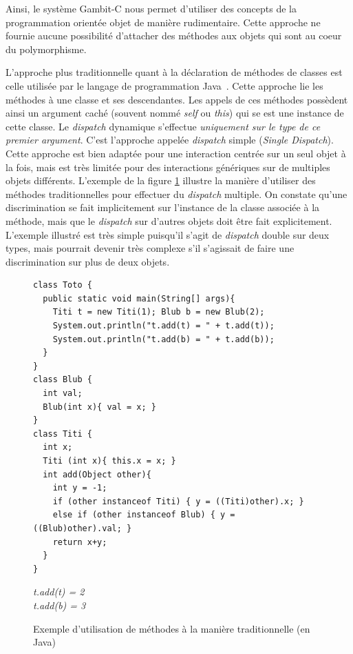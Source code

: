 \documentclass[12pt,twoside,letterpaper,francais]{book}
\begin{document}
Ainsi, le système Gambit-C nous permet d'utiliser des concepts de la
programmation orientée objet de manière rudimentaire. Cette approche
ne fournie aucune possibilité d'attacher des méthodes aux objets qui
sont au coeur du polymorphisme.

L'approche plus traditionnelle quant à la déclaration de méthodes de
classes est celle utilisée par le langage de programmation
Java~\cite{JavaSpec}. Cette approche lie les méthodes à une classe et
ses descendantes. Les appels de ces méthodes possèdent ainsi un
argument caché (souvent nommé \textit{self} ou \textit{this}) qui se
est une instance de cette classe. Le \textit{dispatch} dynamique
s'effectue \emph{uniquement sur le type de ce premier argument}. C'est
l'approche appelée \textit{dispatch} simple (\textit{Single
  Dispatch}). Cette approche est bien adaptée pour une interaction
centrée sur un seul objet à la fois, mais est très limitée pour des
interactions génériques sur de multiples objets différents. L'exemple
de la figure \ref{OO:JavaDispatch} illustre la manière d'utiliser des
méthodes traditionnelles pour effectuer du \textit{dispatch}
multiple. On constate qu'une discrimination se fait implicitement sur
l'instance de la classe associée à la méthode, mais que le
\textit{dispatch} sur d'autres objets doit être fait
explicitement. L'exemple illustré est très simple puisqu'il s'agit de
\textit{dispatch} double sur deux types, mais pourrait devenir très
complexe s'il s'agissait de faire une discrimination sur plus de deux
objets.

\begin{figure}[h!]
  \begin{verbatim}
class Toto {
  public static void main(String[] args){
    Titi t = new Titi(1); Blub b = new Blub(2);
    System.out.println("t.add(t) = " + t.add(t));
    System.out.println("t.add(b) = " + t.add(b));
  }
} 
class Blub {
  int val;
  Blub(int x){ val = x; }
}
class Titi {
  int x;
  Titi (int x){ this.x = x; }
  int add(Object other){
    int y = -1;
    if (other instanceof Titi) { y = ((Titi)other).x; }
    else if (other instanceof Blub) { y = ((Blub)other).val; }
    return x+y;
  }
}
  \end{verbatim}
  {{\it
t.add(t) = 2\\
t.add(b) = 3
  }}
  \caption{Exemple d'utilisation de méthodes à la manière
    traditionnelle (en Java)}
  \label{OO:JavaDispatch}
\end{figure}

\FloatBarrier
\end{document}
